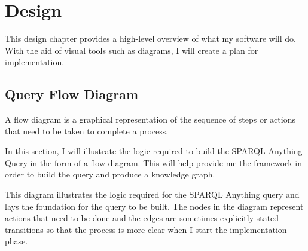 \chapter{Design}
This design chapter provides a high-level overview of what my software will do. With the aid of visual tools such as diagrams, I will create a plan for implementation. 

\section{Query Flow Diagram}
\hspace{0.5cm} A flow diagram is a graphical representation of the sequence of steps or actions that need to be taken to complete a process. \cite{flowchart}

In this section, I will illustrate the logic required to build the SPARQL Anything Query in the form of a flow diagram. This will help provide me the framework in order to build the query and produce a knowledge graph.

\bigskip
\begin{center}
\end{center}

This diagram illustrates the logic required for the SPARQL Anything query and lays the foundation for the query to be built. The nodes in the diagram represent actions that need to be done and the edges are sometimes explicitly stated transitions so that the process is more clear when I start the implementation phase.

